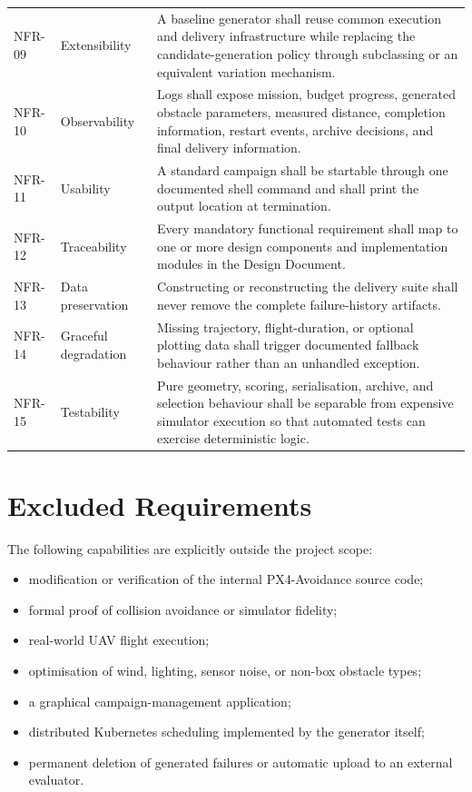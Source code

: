 \documentclass[11pt,a4paper]{report}
\begin{document}
\begin{longtable}{L{1.7cm} L{2.4cm} L{10.5cm}}
NFR-09 & Extensibility & A baseline generator shall reuse common execution and delivery infrastructure while replacing the candidate-generation policy through subclassing or an equivalent variation mechanism.\\
NFR-10 & Observability & Logs shall expose mission, budget progress, generated obstacle parameters, measured distance, completion information, restart events, archive decisions, and final delivery information.\\
NFR-11 & Usability & A standard campaign shall be startable through one documented shell command and shall print the output location at termination.\\
NFR-12 & Traceability & Every mandatory functional requirement shall map to one or more design components and implementation modules in the Design Document.\\
NFR-13 & Data preservation & Constructing or reconstructing the delivery suite shall never remove the complete failure-history artifacts.\\
NFR-14 & Graceful degradation & Missing trajectory, flight-duration, or optional plotting data shall trigger documented fallback behaviour rather than an unhandled exception.\\
NFR-15 & Testability & Pure geometry, scoring, serialisation, archive, and selection behaviour shall be separable from expensive simulator execution so that automated tests can exercise deterministic logic.\\
\bottomrule
\end{longtable}

\section{Excluded Requirements}
The following capabilities are explicitly outside the project scope:
\begin{itemize}
  \item modification or verification of the internal PX4-Avoidance source code;
  \item formal proof of collision avoidance or simulator fidelity;
  \item real-world UAV flight execution;
  \item optimisation of wind, lighting, sensor noise, or non-box obstacle types;
  \item a graphical campaign-management application;
  \item distributed Kubernetes scheduling implemented by the generator itself;
  \item permanent deletion of generated failures or automatic upload to an external evaluator.
\end{itemize}
\end{document}
